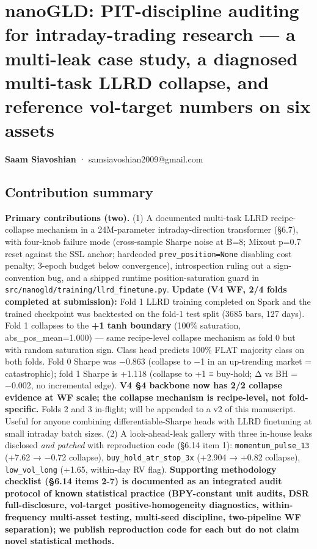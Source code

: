 \documentclass[
]{article}
\author{}
\date{}
\begin{document}
\section{nanoGLD: PIT-discipline auditing for intraday-trading research
--- a multi-leak case study, a diagnosed multi-task LLRD collapse, and
reference vol-target numbers on six
assets}\label{nanogld-pit-discipline-auditing-for-intraday-trading-research-a-multi-leak-case-study-a-diagnosed-multi-task-llrd-collapse-and-reference-vol-target-numbers-on-six-assets}

\textbf{Saam Siavoshian} · samsiavoshian2009@gmail.com

\subsection{Contribution summary}\label{contribution-summary}

\textbf{Primary contributions (two).} (1) A documented multi-task LLRD
recipe-collapse mechanism in a 24M-parameter intraday-direction
transformer (§6.7), with four-knob failure mode (cross-sample Sharpe
noise at B=8; Mixout p=0.7 reset against the SSL anchor; hardcoded
\texttt{prev\_position=None} disabling cost penalty; 3-epoch budget
below convergence), introspection ruling out a sign-convention bug, and
a shipped runtime position-saturation guard in
\texttt{src/nanogld/training/llrd\_finetune.py}. \textbf{Update (V4 WF,
2/4 folds completed at submission):} Fold 1 LLRD training completed on
Spark and the trained checkpoint was backtested on the fold-1 test split
(3685 bars, 127 days). Fold 1 collapses to the \textbf{+1 tanh boundary}
(100\% saturation, abs\_pos\_mean=1.000) --- same recipe-level collapse
mechanism as fold 0 but with random saturation sign. Class head predicts
100\% FLAT majority class on both folds. Fold 0 Sharpe was −0.863
(collapse to −1 in an up-trending market = catastrophic); fold 1 Sharpe
is +1.118 (collapse to +1 ≡ buy-hold; Δ vs BH = −0.002, no incremental
edge). \textbf{V4 §4 backbone now has 2/2 collapse evidence at WF scale;
the collapse mechanism is recipe-level, not fold-specific.} Folds 2 and
3 in-flight; will be appended to a v2 of this manuscript. Useful for
anyone combining differentiable-Sharpe heads with LLRD finetuning at
small intraday batch sizes. (2) A look-ahead-leak gallery with three
in-house leaks disclosed \emph{and patched} with reproduction code
(§6.14 item 1): \texttt{momentum\_pulse\_13} (+7.62 → −0.72 collapse),
\texttt{buy\_hold\_atr\_stop\_3x} (+2.904 → +0.82 collapse),
\texttt{low\_vol\_long} (+1.65, within-day RV flag). \textbf{Supporting
methodology checklist (§6.14 items 2-7) is documented as an integrated
audit protocol of known statistical practice (BPY-constant unit audits,
DSR full-disclosure, vol-target positive-homogeneity diagnostics,
within-frequency multi-asset testing, multi-seed discipline,
two-pipeline WF separation); we publish reproduction code for each but
do not claim novel statistical methods.}
\end{document}
